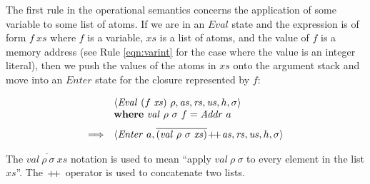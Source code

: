 \documentclass[10pt,a4paper]{exam} %
\begin{document}
The first rule in the operational semantics concerns the application of some variable to some list of atoms. If we are in an $\mathit{Eval}$ state and the expression is of form $\mathit{f}~\mathit{xs}$ where $f$ is a variable, $\mathit{xs}$ is a list of atoms, and the value of $f$ is a memory address (see Rule \ref{eqn:varint} for the case where the value is an integer literal), then we push the values of the atoms in $\mathit{xs}$ onto the argument stack and move into an $\mathit{Enter}$ state for the closure represented by $f$:
\begin{mdframed}
\begin{equation}
\begin{array}{cl}
 & \langle \mathit{Eval}~(f~\mathit{xs})~\rho, \mathit{as}, \mathit{rs}, \mathit{us}, h, \sigma \rangle \\
 & \mathbf{where}~\mathit{val}~\rho~\sigma~f = \mathit{Addr}~a\\[0.25cm]
\Longrightarrow & \langle \mathit{Enter}~a, \overline{(\mathit{val}~\rho~\sigma~\mathit{xs})} \append \mathit{as}, \mathit{rs}, \mathit{us}, h, \sigma \rangle
\end{array}
\end{equation}
\end{mdframed}
The $\overline{\mathit{val}~\rho~\sigma~\mathit{xs}}$ notation is used to mean ``apply $\mathit{val}~\rho~\sigma$ to every element in the list $\mathit{xs}$''. The $\append$ operator is used to concatenate two lists.
\end{document}

